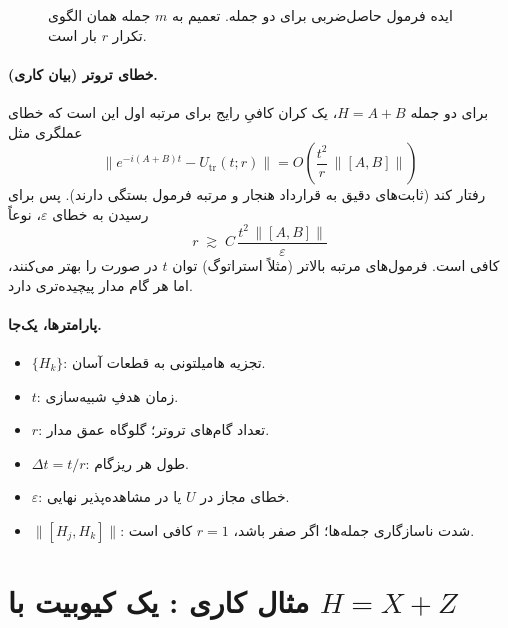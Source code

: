 \begin{figure}[htbp]
	\centering
	\begin{latin}
		\resizebox{0.88\textwidth}{!}{%
		}
	\end{latin}
	\caption{ایده فرمول حاصل‌ضربی برای دو جمله. تعمیم به $m$ جمله همان الگوی تکرار $r$ بار است.}
	\label{fig:trotter-product}
\end{figure}

\paragraph{خطای تروتر (بیان کاری).}
برای دو جمله $H=A+B$، یک کران کافیِ رایج برای مرتبه اول این است که خطای عملگری مثل
\begin{equation}
	\label{eq:trotter-err}
	\bigl\lVert e^{-i(A+B)t}-U_{\mathrm{tr}}(t;r)\bigr\rVert
	=
	O\!\left(\frac{t^{2}}{r}\,\bigl\lVert[A,B]\bigr\rVert\right)
\end{equation}
رفتار کند (ثابت‌های دقیق به قرارداد هنجار و مرتبه فرمول بستگی دارند). پس برای رسیدن به خطای $\varepsilon$، نوعاً
\begin{equation}
	r \;\gtrsim\; C\,\frac{t^{2}\,\lVert[A,B]\rVert}{\varepsilon}
\end{equation}
کافی است. فرمول‌های مرتبه بالاتر (مثلاً استراتوگ) توان $t$ در صورت را بهتر می‌کنند، اما هر گام مدار پیچیده‌تری دارد.

\paragraph{پارامترها، یک‌جا.}
\begin{itemize}
	\item $\{H_k\}$: تجزیه هامیلتونی به قطعات آسان.
	\item $t$: زمان هدفِ شبیه‌سازی.
	\item $r$: تعداد گام‌های تروتر؛ گلوگاه عمق مدار.
	\item $\Delta t=t/r$: طول هر ریزگام.
	\item $\varepsilon$: خطای مجاز در $U$ یا در مشاهده‌پذیر نهایی.
	\item $\lVert[H_j,H_k]\rVert$: شدت ناسازگاری جمله‌ها؛ اگر صفر باشد، $r=1$ کافی است.
\end{itemize}

\section{مثال کاری : یک کیوبیت با $H=X+Z$}
\label{sec:trotter-example}

